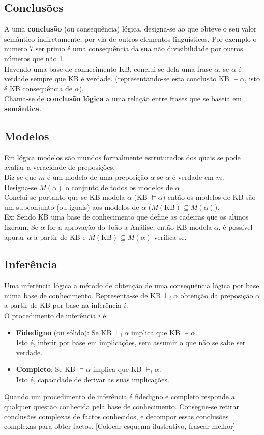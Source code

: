 \documentclass[]{report}
\begin{document}
\subsection{Conclusões}
A uma \textbf{conclusão} (ou consequência) lógica, designa-se ao que obteve o seu valor semântico indiretamente, por via de outros elementos linguísticos. Por exemplo o numero 7 ser primo é uma consequência da sua não divisibilidade por outros números que não 1.\\[2mm]
Havendo uma base de conhecimento KB, conclui-se dela uma frase $\alpha$, se $\alpha$ é verdade sempre que KB é verdade. (representando-se esta conclusão $\text{KB }\models \alpha$, isto é KB consequência de $\alpha$).\\[2mm]
Chama-se de \textbf{conclusão lógica} a uma relação entre frases que se baseia em \textbf{semântica}.
\subsection{Modelos}
Em lógica modelos são mundos formalmente estruturados dos quais se pode avaliar a veracidade de preposições.\\
Diz-se que $m$ é um modelo de uma preposição $\alpha$ se $\alpha$ é verdade em $m$.\\
Designa-se $M(\alpha)$ o conjunto de todos os modelos de $\alpha$.\\
Conclui-se portanto que se KB modela $\alpha$ ($\text{KB } \models \alpha$) então os modelos de KB são um subconjunto (ou iguais) aos modelos de $\alpha$ ($M(\text{KB}) \subseteq M(\alpha)$).\\
Ex: Sendo KB uma base de conhecimento que define as cadeiras que os alunos fizeram. Se $\alpha$ for a aprovação do João a Análise, então KB modela $\alpha$, é possível apurar $\alpha$ a partir de KB e $M(\text{KB}) \subseteq M(\alpha)$ verifica-se.
\subsection{Inferência}
Uma inferência lógica a método de obtenção de uma consequência lógica por base numa base de conhecimento. Representa-se de KB $\vdash_i \alpha$ obtenção da preposição $\alpha$ a partir de KB por base na inferência $i$.\\[2mm]
O procedimento de inferência $i$ é:
\begin{itemize}
\item \textbf{Fidedigno} (ou sólido): Se KB $\vdash_i \alpha$ implica que KB $\models \alpha$.\\
Isto é, inferir por base em implicações, sem assumir o que não se sabe ser verdade.
\item \textbf{Completo}: Se KB $\models \alpha$ implica que KB $\vdash_i \alpha$.\\
Isto é, capacidade de derivar as suas implicações.
\end{itemize}
Quando um procedimento de inferência é fidedigno e completo responde a qualquer questão conhecida pela base de conhecimento. Consegue-se retirar conclusões complexas de factos conhecidos, e decompor essas conclusões complexas para obter factos.
[Colocar esquema ilustrativo, frasear melhor]
\end{document}
